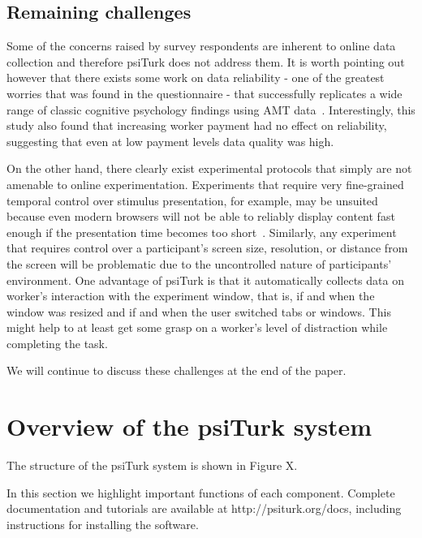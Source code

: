 \documentclass[twocolumn]{svjour3}          %
\begin{document}
\subsection{Remaining challenges}
Some of the concerns raised by survey respondents are inherent to online data collection and therefore psiTurk does
not address them.
It is worth pointing out however that there exists some work on data reliability - one of the greatest worries that was found
in the questionnaire - that successfully replicates a wide range of classic cognitive psychology findings using AMT data~\citep{crump2013evaluating}. Interestingly, this study also found that increasing worker payment had no effect on reliability, suggesting that even 
at low payment levels data quality was high. 

On the other hand, there clearly exist experimental protocols that simply are not amenable to online
experimentation. Experiments that require very fine-grained temporal control over stimulus presentation, for example, 
may be unsuited because even modern browsers will not be able to reliably display content fast enough if the presentation time
becomes too short~\citep{crump2013evaluating}.
Similarly, any experiment that requires  control over a participant's screen size, resolution, or distance
from the screen will be problematic due to the uncontrolled nature of participants' environment. One advantage of psiTurk is that
it automatically collects data on worker's interaction with the experiment window, that is, if and when the window was resized and
if and when the user switched tabs or windows. This might help to at least get some grasp on a worker's level of distraction while completing
the task. 


We will continue to discuss these challenges at the end of the paper.





\section{Overview of the psiTurk system}

The structure of the psiTurk system is shown in Figure X.

In this section we highlight important functions of each component.
Complete documentation and tutorials are available at http://psiturk.org/docs, including instructions for installing the software.
\end{document}
